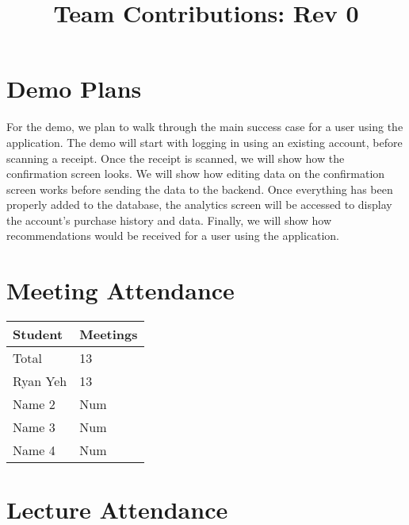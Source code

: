\documentclass{article}
\title{Team Contributions: Rev 0\\\progname}
\author{\authname}
\date{}
\begin{document}
\maketitle

\section{Demo Plans}

For the demo, we plan to walk through the main success case for a user using the application.
The demo will start with logging in using an existing account, before scanning a receipt. Once
the receipt is scanned, we will show how the confirmation screen looks. We will show how editing
data on the confirmation screen works before sending the data to the backend. Once everything has
been properly added to the database, the analytics screen will be accessed to display the account's
purchase history and data. Finally, we will show how recommendations would be received for a user
using the application.

\section{Meeting Attendance}


\begin{table}[H]
\centering
\begin{tabular}{ll}
\toprule
\textbf{Student} & \textbf{Meetings}\\
\midrule
Total & 13\\
Ryan Yeh & 13\\
Name 2 & Num\\
Name 3 & Num\\
Name 4 & Num\\
\bottomrule
\end{tabular}
\end{table}


\section{Lecture Attendance}
\end{document}
